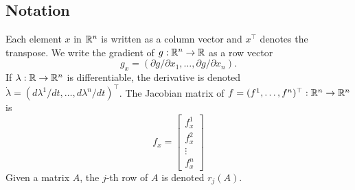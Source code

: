 \subsection*{Notation} Each element $x$ in $\mathbb{R}^n$ is written as a column vector 
and 
$x^\top$ denotes the transpose. We write the gradient of $g:\mathbb{R}^n\to\mathbb{R}$ as a row 
vector 
    \[ g_x =(\partial g/\partial x_1,\ldots, \partial g/\partial x_n). \]
If $\lambda:\mathbb{R}\to\mathbb{R}^n$ is differentiable, the derivative is denoted 
$\dot{\lambda}=(d\lambda^1/dt,\ldots,d\lambda^n/dt)^\top$. The Jacobian matrix 
of $f=(f^1,\ldots,f^n)^\top:\mathbb{R}^n\to\mathbb{R}^n$ is   
\[f_x=
  \begin{bmatrix}
    f^1_x\\
    f^2_x\\
    \vdots \\
    f^n_x
  \end{bmatrix}
 \]
Given a matrix $A$, the $j$-th row of $A$ is denoted $r_j(A)$.
